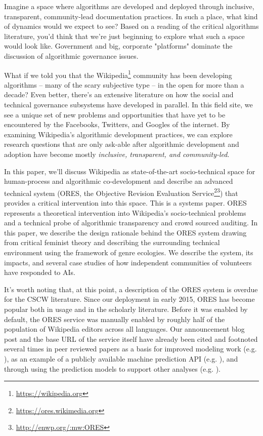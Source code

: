 Imagine a space where algorithms are developed and deployed through inclusive, transparent, community-lead documentation practices.  In such a place, what kind of dynamics would we expect to see?  Based on a reading of the critical algorithms literature, you'd think that we're just beginning to explore what such a space would look like.  Government and big, corporate "platforms" dominate the discussion of algorithmic governance issues\cite{crawford2016algorithm}\cite{diakopoulos2015algorithmic}\cite{gillespie2014relevance}\cite{tufekci2015algorithms}.

What if we told you that the Wikipedia\footnote{\url{https://wikipedia.org}} community has been developing algorithms -- many of the scary subjective type -- in the open for more than a decade?  Even better, there's an extensive literature on how the social and technical governance subsystems have developed in parallel.  In this field site, we see a unique set of new problems and opportunities that have yet to be encountered by the Facebooks, Twitters, and Googles of the internet. By examining Wikipedia's algorithmic development practices, we can explore research questions that are only ask-able after algorithmic development and adoption have become mostly \emph{inclusive, transparent, and community-led}.

In this paper, we'll discuss Wikipedia as state-of-the-art socio-technical space for human-process and algorithmic co-development and describe an advanced technical system (ORES, the Objective Revision Evaluation Service\footnote{\url{https://ores.wikimedia.org}}\footnote{\url{http://enwp.org/:mw:ORES}}) that provides a critical intervention into this space.  This is a systems paper.  ORES represents a theoretical intervention into Wikipedia's socio-technical problems and a technical probe of algorithmic transparency and crowd sourced auditing.  In this paper, we describe the design rationale behind the ORES system drawing from critical feminist theory and describing the surrounding technical environment using the framework of genre ecologies.  We describe the system, its impacts, and several case studies of how independent communities of volunteers have responded to AIs.

It's worth noting that, at this point, a description of the ORES system is overdue for the CSCW literature.  Since our deployment in early 2015, ORES has become popular both in usage and in the scholarly literature.  Before it was enabled by default, the ORES service was manually enabled by roughly half of the population of Wikipedia editors across all languages.  Our announcement blog post\cite{halfaker2015artificial} and the base URL of the service itself have already been cited and footnoted several times in peer reviewed papers as a basis for improved modeling work (e.g. \cite{dang2016quality}), as an example of a publicly available machine prediction API (e.g. \cite{lewoniewski2017relative}), and through using the prediction models to support other analyses (e.g. \cite{rezguia2017stigmergic}).


